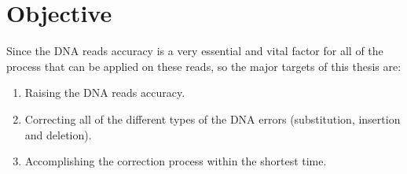 \documentclass{llncs}
\begin{document}
\section{Objective}
Since the DNA reads accuracy is a very essential and vital factor for all of the process that can be applied on these reads, so the major targets of this thesis are:
\begin{enumerate}
   \item Raising the DNA reads accuracy.

   \item Correcting all of the different types of the DNA errors (substitution, insertion and deletion).

   \item Accomplishing the correction process within the shortest time.
\end{enumerate}

%
\end{document}
